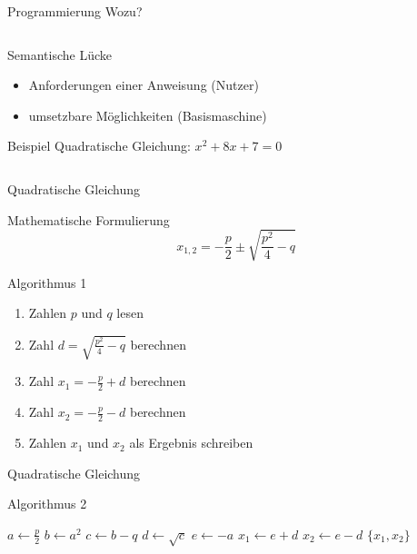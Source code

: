 \begin{frame}[shrink]{Programmierung Wozu?}
\begin{columns}[t]
\begin{column}{0.5\textwidth}
\begin{block}{Semantische Lücke}
\begin{itemize}
\begin{itemize}
                    \item Anforderungen einer Anweisung (Nutzer)
                    \item umsetzbare Möglichkeiten (Basismaschine)
                    \end{itemize}
                \end{itemize}
            \end{block}
            \begin{block}{Beispiel}
                Quadratische Gleichung: $x^2 + 8x + 7 = 0$
            \end{block}
        \end{column}
    \end{columns}    
\end{frame}

\begin{frame}{Quadratische Gleichung}
    \begin{block}{Mathematische Formulierung}
        \[x_{1,2} = -\frac{p}{2}\pm\sqrt{\frac{p^2}{4}-q}\]
    \end{block}
    \begin{block}{Algorithmus 1}
        \begin{enumerate}
        \item Zahlen $p$ und $q$ lesen
        \item Zahl $d = \sqrt{\frac{p^2}{4}-q}$ berechnen
        \item Zahl $x_1 = -\frac{p}{2} + d$ berechnen
        \item Zahl $x_2 = -\frac{p}{2} - d$ berechnen
        \item Zahlen $x_1$ und $x_2$ als Ergebnis schreiben
        \end{enumerate}
    \end{block}
\end{frame}

\begin{frame}[shrink]{Quadratische Gleichung}
    \begin{block}{Algorithmus 2}
        \begin{algorithm}[H]
        \label{alg:2}
        \begin{algorithmic}
                \State $a\gets \frac{p}{2}$
                \State $b\gets a^2$
                \State $c\gets b - q$
                \State $d\gets \sqrt{c}$
                \State $e\gets -a$
                \State $x_{1}\gets e+d$
                \State $x_{2}\gets e-d$
                \State \Return $\{ x_{1}, x_{2}\}$
            \EndFunction
        \end{algorithmic}
        \end{algorithm}
    \end{block}
\end{frame}

